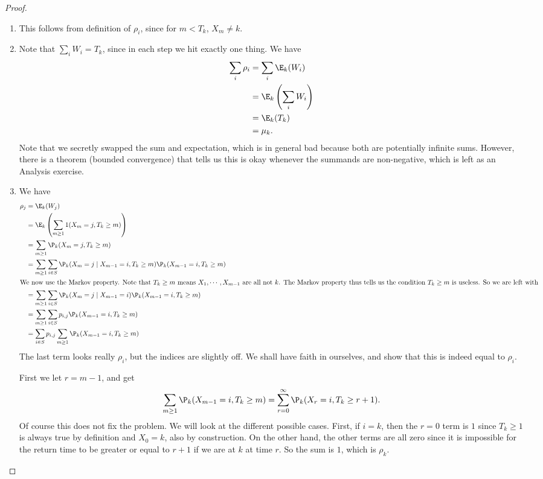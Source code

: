 \documentclass[a4paper]{article}
\begin{document}
\begin{proof}\leavevmode
  \begin{enumerate}
    \item This follows from definition of $\rho_i$, since for $m < T_k$, $X_m \not= k$.
    \item Note that $\sum_i W_i = T_k$, since in each step we hit exactly one thing. We have
      \begin{align*}
        \sum_i \rho_i &= \sum_i \E_k(W_i)\\
        &= \E_k\left(\sum_i W_i\right)\\
        &= \E_k(T_k) \\
        &= \mu_k.
      \end{align*}
      Note that we secretly swapped the sum and expectation, which is in general bad because both are potentially infinite sums. However, there is a theorem (bounded convergence) that tells us this is okay whenever the summands are non-negative, which is left as an Analysis exercise.
    \item We have
      \begin{align*}
        \rho_j &= \E_k(W_j)\\
        &= \E_k\left(\sum_{m \geq 1}1(X_m = j, T_k \geq m)\right) \\
        &= \sum_{m\geq 1}\P_k(X_m = j, T_k \geq m)\\
        &= \sum_{m \geq 1}\sum_{i \in S} \P_k(X_m = j \mid X_{m - 1} = i, T_k \geq m) \P_k(X_{m - 1} = i, T_k \geq m)\\
        \intertext{We now use the Markov property. Note that $T_k \geq m$ means $X_1, \cdots, X_{m - 1}$ are all not $k$. The Markov property thus tells us the condition $T_k \geq m$ is useless. So we are left with}
        &= \sum_{m \geq 1}\sum_{i \in S} \P_k(X_m = j \mid X_{m - 1} = i) \P_k(X_{m - 1} = i, T_k \geq m)\\
        &= \sum_{m \geq 1}\sum_{i \in S} p_{i, j} \P_k(X_{m - 1} = i, T_k \geq m)\\
        &= \sum_{i \in S} p_{i, j} \sum_{m \geq 1} \P_k(X_{m - 1} = i, T_k \geq m)
      \end{align*}
      The last term looks really $\rho_i$, but the indices are slightly off. We shall have faith in ourselves, and show that this is indeed equal to $\rho_i$.

      First we let $r = m - 1$, and get
      \[
        \sum_{m \geq 1} \P_k (X_{m - 1} = i, T_k \geq m) = \sum_{r = 0}^\infty \P_k(X_r = i, T_k \geq r + 1).
      \]
      Of course this does not fix the problem. We will look at the different possible cases. First, if $i = k$, then the $r = 0$ term is $1$ since $T_k \geq 1$ is always true by definition and $X_0 = k$, also by construction. On the other hand, the other terms are all zero since it is impossible for the return time to be greater or equal to $r + 1$ if we are at $k$ at time $r$. So the sum is $1$, which is $\rho_k$.


\end{enumerate}
\end{proof}
\end{document}
